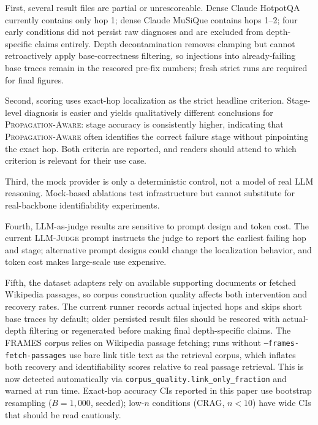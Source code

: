 \documentclass[11pt]{article}
\newcommand{\pa}{\textnormal{\textsc{Propagation-Aware}}}
\newcommand{\lj}{\textnormal{\textsc{LLM-Judge}}}
\begin{document}
First, several result files are partial or unrescoreable.  Dense Claude
HotpotQA currently contains only hop 1; dense Claude MuSiQue contains hops
1--2; four early conditions did not persist raw diagnoses and are excluded
from depth-specific claims entirely.  Depth decontamination removes clamping
but cannot retroactively apply base-correctness filtering, so injections into
already-failing base traces remain in the rescored pre-fix numbers; fresh
strict runs are required for final figures.

Second, scoring uses exact-hop localization as the strict headline criterion.
Stage-level diagnosis is easier and yields qualitatively different conclusions
for \pa{}: stage accuracy is consistently higher, indicating that \pa{} often
identifies the correct failure stage without pinpointing the exact hop.  Both
criteria are reported, and readers should attend to which criterion is relevant
for their use case.

Third, the mock provider is only a deterministic control, not a model of real
LLM reasoning.  Mock-based ablations test infrastructure but cannot substitute
for real-backbone identifiability experiments.

Fourth, LLM-as-judge results are sensitive to prompt design and token cost.
The current \lj{} prompt instructs the judge to report the earliest failing
hop and stage; alternative prompt designs could change the localization
behavior, and token cost makes large-scale use expensive.

Fifth, the dataset adapters rely on available supporting documents or fetched
Wikipedia passages, so corpus construction quality affects both intervention and
recovery rates.  The current runner records actual injected hops and skips short
base traces by default; older persisted result files should be rescored with
actual-depth filtering or regenerated before making final depth-specific claims.
The FRAMES corpus relies on Wikipedia passage fetching; runs without
\texttt{--frames-fetch-passages} use bare link title text as the retrieval
corpus, which inflates both recovery and identifiability scores relative to real
passage retrieval.  This is now detected automatically via
\texttt{corpus\_quality.link\_only\_fraction} and warned at run time.
Exact-hop accuracy CIs reported in this paper use bootstrap resampling ($B =
1{,}000$, seeded); low-$n$ conditions (CRAG, $n < 10$) have wide CIs that
should be read cautiously.
\end{document}
